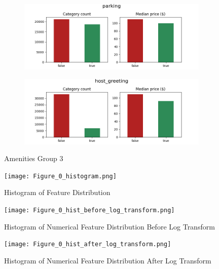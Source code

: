 \begin{figure}[H]
    \centering
    \begin{subfigure}[b]{0.3\textwidth}
        \centering
        \includegraphics[width=\textwidth]{figures/amenities/group3/parking.png}
    \end{subfigure}
    \hfill
    \begin{subfigure}[b]{0.3\textwidth}
        \centering
        \includegraphics[width=\textwidth]{figures/amenities/group3/host_greetings.png}
    \end{subfigure}

    \caption{Amenities Group 3}
    \label{fig:amenities-group3}
\end{figure}


\begin{figure}[H] \centering
\caption{Histogram of Feature Distribution}
\texttt{[image: Figure\_0\_histogram.png]}
\label{fig:histogram-feature-distribution}
\end{figure}


\begin{figure}[H] \centering
\caption{Histogram of Numerical Feature Distribution Before Log Transform }
\texttt{[image: Figure\_0\_hist\_before\_log\_transform.png]}
\label{fig:histogram-before-transform}
\end{figure}

\begin{figure}[H] \centering
\caption{Histogram of Numerical Feature Distribution After Log Transform }
\texttt{[image: Figure\_0\_hist\_after\_log\_transform.png]}
\label{fig:histogram-after-transform}
\end{figure}
